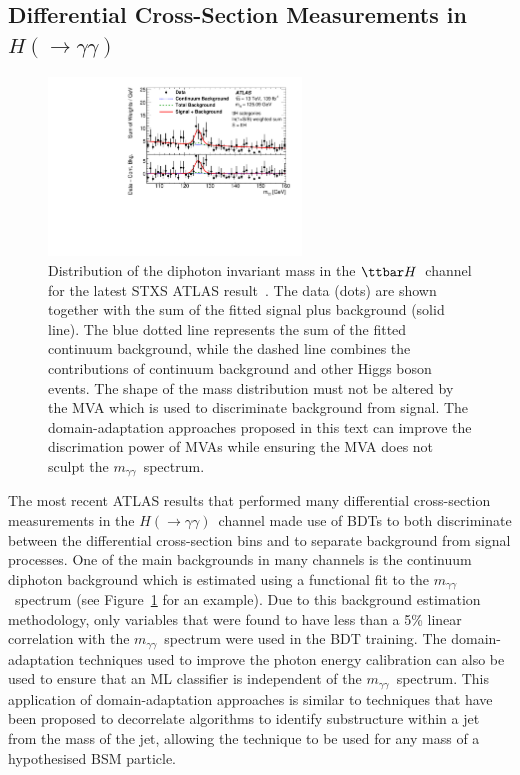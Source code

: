 \documentclass[letter, USenglish, 11pt, subfigure]{article}
\newcommand{\ttH}{\ensuremath{\ttbar H}}
\newcommand{\myy}{\ensuremath{m_{\gamma\gamma}}}
\newcommand{\hyy}{\ensuremath{H(\to\gamma\gamma)}}
\begin{document}
\subsection{Differential Cross-Section Measurements in \hyy}
\begin{figure}[ht]
  \centering
  \includegraphics[width=0.6\textwidth]{figures/tth_myy.pdf}
  \caption{\label{fig:myy} Distribution of the diphoton invariant mass in the \ttH\ channel for the latest STXS ATLAS result~\cite{ATLAS_STXS}. The data (dots) are shown together with the sum of the fitted signal plus background (solid line). The blue dotted line represents the sum of the fitted continuum background, while the dashed line combines the contributions of continuum background and other Higgs boson events. The shape of the mass distribution must not be altered by the MVA which is used to discriminate background from signal. The domain-adaptation approaches proposed in this text can improve the discrimation power of MVAs while ensuring the MVA does not sculpt the \myy\ spectrum.}
\end{figure}

The most recent ATLAS results that performed many differential cross-section measurements in the \hyy\ channel made use of BDTs to both discriminate between the differential cross-section bins and to separate background from signal processes. One of the main backgrounds in many channels is the continuum diphoton background which is estimated using a functional fit to the \myy\ spectrum (see Figure~\ref{fig:myy} for an example). Due to this background estimation methodology, only variables that were found to have less than a 5\% linear correlation with the \myy\ spectrum were used in the BDT training. The domain-adaptation techniques used to improve the photon energy calibration can also be used to ensure that an ML classifier is independent of the \myy\ spectrum. This application of domain-adaptation approaches is similar to techniques that have been proposed to decorrelate algorithms to identify substructure within a jet from the mass of the jet, allowing the technique to be used for any mass of a hypothesised BSM particle.
\end{document}
